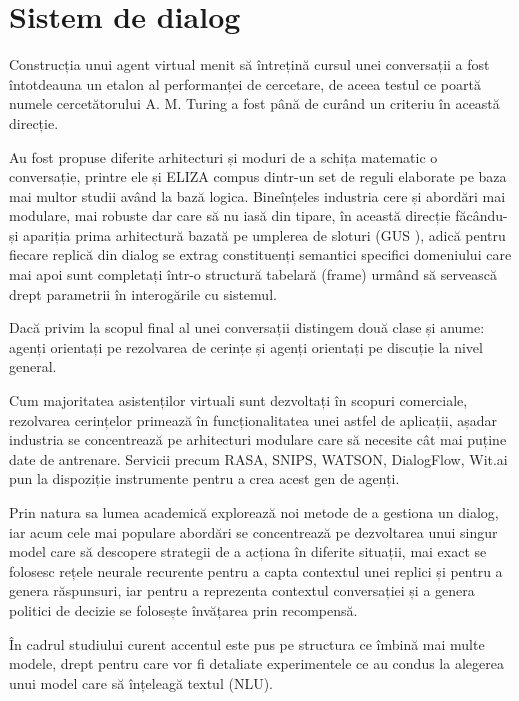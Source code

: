 \chapter{Sistem de dialog}

Construcția unui agent virtual menit să întrețină cursul unei conversații a fost întotdeauna un etalon al performanței de cercetare, de aceea testul ce poartă numele cercetătorului A. M. Turing \cite{test-turing} a fost până de curând un criteriu în această direcție.

Au fost propuse diferite arhitecturi și moduri de a schița matematic o conversație, printre ele și ELIZA \cite{weizenbaum} compus dintr-un set de reguli elaborate pe baza mai multor studii având la bază logica. Bineînțeles industria cere și abordări mai modulare, mai robuste dar care să nu iasă din tipare, în această direcție făcându-și apariția prima arhitectură bazată pe umplerea de sloturi (GUS \cite{gus}), adică pentru fiecare replică din dialog se extrag constituenți semantici specifici domeniului care mai apoi sunt completați într-o structură tabelară (frame) urmând să servească drept parametrii în interogările cu sistemul.

Dacă privim la scopul final al unei conversații distingem două clase și anume: agenți orientați pe rezolvarea de cerințe și agenți orientați pe discuție la nivel general.

Cum majoritatea asistenților virtuali sunt dezvoltați în scopuri comerciale, rezolvarea cerințelor primează în funcționalitatea unei astfel de aplicații, așadar industria se concentrează pe arhitecturi modulare care să necesite cât mai puține date de antrenare. Servicii precum RASA, SNIPS, WATSON, DialogFlow, Wit.ai pun la dispoziție instrumente pentru a crea acest gen de agenți.

Prin natura sa lumea academică explorează noi metode de a gestiona un dialog, iar acum cele mai populare abordări se concentrează pe dezvoltarea unui singur model care să descopere strategii de a acționa în diferite situații, mai exact se folosesc rețele neurale recurente pentru a capta contextul unei replici și pentru a genera răspunsuri, iar pentru a reprezenta contextul conversației și a genera politici de decizie se folosește învățarea prin recompensă. \cite{e2e-1, e2e-2, e2e-3, kv-manning}

În cadrul studiului curent accentul este pus pe structura ce îmbină mai multe modele, drept pentru care vor fi detaliate experimentele ce au condus la alegerea unui model care să înțeleagă textul (NLU).

